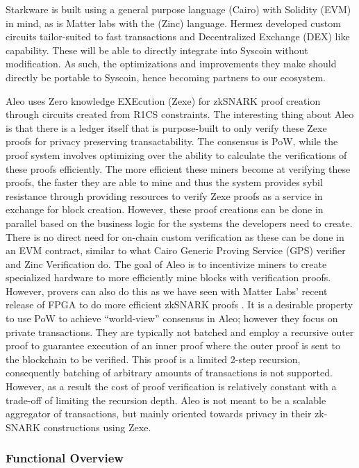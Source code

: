 \documentclass[peerreview]{ieeesyscoin}
\begin{document}
Starkware is built using a general purpose language (Cairo) with Solidity (EVM) in mind, as is Matter labs with the (Zinc) language. Hermez developed custom circuits tailor-suited to fast transactions and Decentralized Exchange (DEX) like capability. These will be able to directly integrate into Syscoin without modification. As such, the optimizations and improvements they make should directly be portable to Syscoin, hence becoming partners to our ecosystem.

Aleo uses Zero knowledge EXEcution (Zexe) for zkSNARK proof creation through circuits created from R1CS constraints. The interesting thing about Aleo is that there is a ledger itself that is purpose-built to only verify these Zexe proofs for privacy preserving transactability. The consensus is PoW, while the proof system involves optimizing over the ability to calculate the verifications of these proofs efficiently. The more efficient these miners become at verifying these proofs, the faster they are able to mine and thus the system provides sybil resistance through providing resources to verify Zexe proofs as a service in exchange for block creation. However, these proof creations can be done in parallel based on the business logic for the systems the developers need to create. There is no direct need for on-chain custom verification as these can be done in an EVM contract, similar to what Cairo Generic Proving Service (GPS) verifier and Zinc Verification do. The goal of Aleo is to incentivize miners to create specialized hardware to more efficiently mine blocks with verification proofs. However, provers can also do this as we have seen with Matter Labs’ recent release of FPGA to do more efficient zkSNARK proofs \cite{Glu20}. It is a desirable property to use PoW to achieve “world-view” consensus in Aleo; however they focus on private transactions. They are typically not batched and employ a recursive outer proof to guarantee execution of an inner proof where the outer proof is sent to the blockchain to be verified. This proof is a limited 2-step recursion, consequently batching of arbitrary amounts of transactions is not supported. However, as a result the cost of proof verification is relatively constant with a trade-off of limiting the recursion depth. Aleo is not meant to be a scalable aggregator of transactions, but mainly oriented towards privacy in their zk-SNARK constructions using Zexe.


\subsubsection{Functional Overview}
\end{document}
